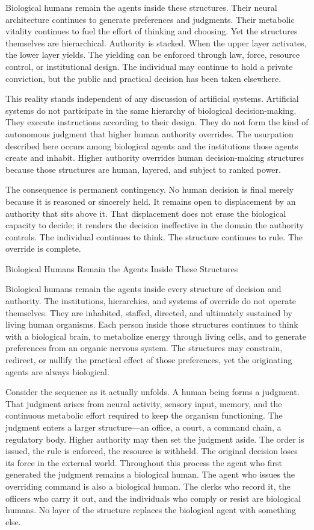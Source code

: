 Biological humans remain the agents inside these structures. Their neural architecture continues to generate preferences and judgments. Their metabolic vitality continues to fuel the effort of thinking and choosing. Yet the structures themselves are hierarchical. Authority is stacked. When the upper layer activates, the lower layer yields. The yielding can be enforced through law, force, resource control, or institutional design. The individual may continue to hold a private conviction, but the public and practical decision has been taken elsewhere.

This reality stands independent of any discussion of artificial systems. Artificial systems do not participate in the same hierarchy of biological decision-making. They execute instructions according to their design. They do not form the kind of autonomous judgment that higher human authority overrides. The usurpation described here occurs among biological agents and the institutions those agents create and inhabit. Higher authority overrides human decision-making structures because those structures are human, layered, and subject to ranked power.

The consequence is permanent contingency. No human decision is final merely because it is reasoned or sincerely held. It remains open to displacement by an authority that sits above it. That displacement does not erase the biological capacity to decide; it renders the decision ineffective in the domain the authority controls. The individual continues to think. The structure continues to rule. The override is complete.

Biological Humans Remain the Agents Inside These Structures

Biological humans remain the agents inside every structure of decision and authority. The institutions, hierarchies, and systems of override do not operate themselves. They are inhabited, staffed, directed, and ultimately sustained by living human organisms. Each person inside those structures continues to think with a biological brain, to metabolize energy through living cells, and to generate preferences from an organic nervous system. The structures may constrain, redirect, or nullify the practical effect of those preferences, yet the originating agents are always biological.

Consider the sequence as it actually unfolds. A human being forms a judgment. That judgment arises from neural activity, sensory input, memory, and the continuous metabolic effort required to keep the organism functioning. The judgment enters a larger structure—an office, a court, a command chain, a regulatory body. Higher authority may then set the judgment aside. The order is issued, the rule is enforced, the resource is withheld. The original decision loses its force in the external world. Throughout this process the agent who first generated the judgment remains a biological human. The agent who issues the overriding command is also a biological human. The clerks who record it, the officers who carry it out, and the individuals who comply or resist are biological humans. No layer of the structure replaces the biological agent with something else.

